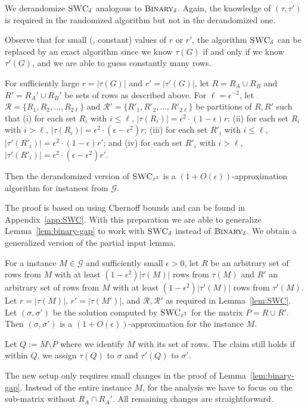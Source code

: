 We derandomize $\textsc{SWC}_\delta$ analogous to $\textsc{Binary}_\delta$.
Again, the knowledge of $(\tau,\tau')$ is required in the randomized algorithm but not in the derandomized one.

Observe that for small (\ie, constant) values of $r$ or $r'$, the algorithm $\textsc{SWC}_\delta$ can be replaced by an exact algorithm since we know $\tau(G)$ if and only if we know $\tau'(G)$, and we are able to guess constantly many rows.

\begin{lemma}\label{lem:SWC}
   For sufficiently large $r = |\tau(G)|$ and $r' = |\tau'(G)|$,
   let $R = R_A \cup R_B$ and $R' = R_A' \cup R_B'$ be sets of rows as described above. %
   For $\ell = \epsilon^{-2}$, let $\mathcal{R} = \{R_1,R_2,\dotsc, R_{2\ell}\}$ and
   $\mathcal{R}' = \{R'_1,R'_2,\dotsc,R'_{2\ell}\}$ be partitions of $R,R'$ such that 
     (i) for each set $R_i$  with $i \le \ell$, $|\tau(R_i)| = \epsilon^2 \cdot (1-\epsilon) r$;
    (ii) for each set $R_i$  with $i > \ell$, $|\tau(R_i)| = \epsilon^2 \cdot (\epsilon - \epsilon^2) r$;
   (iii) for each set $R'_i$ with $i \le \ell$, $|\tau'(R'_i)| = \epsilon^2 \cdot (1-\epsilon) r'$; and
    (iv) for each set $R'_i$ with $i > \ell$, $|\tau'(R'_i)| = \epsilon^2 \cdot (\epsilon - \epsilon^2) r'$.

   Then the derandomized version of $\textsc{SWC}_{\epsilon^3}$ is a $(1 + O(\epsilon))$-approximation algorithm for instances from $\mathcal{G}$. 
\end{lemma}
The proof is based on using Chernoff bounds and can be found in Appendix~\ref{app:SWC}.
With this preparation we are able to generalize Lemma~\ref{lem:binary-gap} to work with $\textsc{SWC}_\delta$ instead of $\textsc{Binary}_\delta$. 
We obtain a generalized version of the partial input lemma.

\begin{lemma}\label{lem:swc-gap}
    For a \GMEC instance $M \in \mathcal{G}$ and sufficiently small $\epsilon > 0$,
    let $R$ be an arbitrary set of rows from $M$ with at least $(1-\epsilon^2)|\tau(M)|$ rows from $\tau(M)$
    and $R'$ an arbitrary set of rows from $M$ with at least $(1-\epsilon^2)|\tau'(M)|$ rows from $\tau'(M)$.
    Let $r = |\tau(M)|$, $r' = |\tau(M')|$, and $\mathcal{R},\mathcal{R}'$ as required in Lemma~\ref{lem:SWC}.
    Let $(\sigma, \sigma')$ be the solution computed by $\textsc{SWC}_{\epsilon^3}$ for the matrix $P = R \cup R'$.
    Then $(\sigma, \sigma')$ is a $(1 + O(\epsilon))$-approximation for the instance $M$.

    Let $Q := M \setminus P$ where we identify $M$ with its set of rows.
    The claim still holds if within $Q$, we assign $\tau(Q)$ to $\sigma$ and $\tau'(Q)$ to $\sigma'$.
\end{lemma}
    The new setup only requires small changes in the proof of Lemma~\ref{lem:binary-gap}.
    Instead of the entire instance $M$, for the analysis we have to focus on the sub-matrix without $R_A \cap R_A'$.
    All remaining changes are straightforward.

